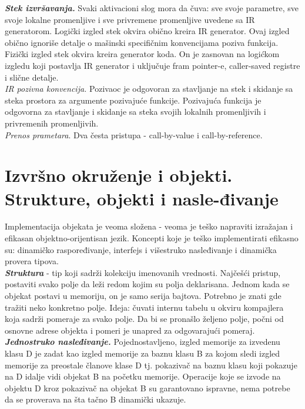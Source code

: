 \documentclass[10pt]{extarticle}
\begin{document}
\textit{\textbf{Stek izvršavanja.}} Svaki aktivacioni slog mora da čuva: sve svoje parametre, sve svoje lokalne promenljive i sve privremene promenljive uvedene sa IR generatorom. Logički izgled stek okvira obično kreira IR generator. Ovaj izgled obično ignoriše detalje o mašinski specifičnim konvencijama poziva funkcija. Fizički izgled stek okvira kreira generator koda. On je zasnovan na logićkom izgledu koji postavlja IR generator i uključuje fram pointer-e, caller-saved registre i slične detalje. \\
\textit{IR pozivna konvencija.} Pozivaoc je odgovoran za stavljanje na stek i skidanje sa steka prostora za argumente pozivajuće funkcije. Pozivajuća funkcija je odgovorna za stavljanje i skidanje sa steka svojih lokalnih promenljivih i privremenih promenljivih.\\
\textit{Prenos prametara}. Dva česta pristupa - call-by-value i call-by-reference.

\section{Izvršno okruženje i objekti. Strukture, objekti i nasle-đivanje}
\noindent
Implementacija objekata je veoma složena - veoma je teško napraviti izražajan i efikasan objektno-orijentisan jezik. Koncepti koje je teško implementirati efikasno su: dinamičko raspoređivanje, interfejs i višestruko nasleđivanje i dinamička provera tipova.\\
\textit{\textbf{Struktura}} - tip koji sadrži kolekciju imenovanih vrednosti. Najčešći pristup, postaviti svako polje da leži redom kojim su polja deklarisana. Jednom kada se objekat postavi u memoriju, on je samo serija bajtova. Potrebno je znati gde tražiti neko konkretno polje. Ideja: čuvati internu tabelu u okviru kompajlera koja sadrži pomeraje za svako polje. Da bi se pronašlo željeno polje, počni od osnovne adrese objekta i pomeri je unapred za odgovarajući pomeraj.\\
\textit{\textbf{Jednostruko nasleđivanje.}} Pojednostavljeno, izgled memorije za izvedenu klasu D je zadat kao izgled memorije za baznu klasu B za kojom sledi izgled memorije za preostale članove klase D tj. pokazivač na baznu klasu koji pokazuje na D idalje vidi objekat B na početku memorije. Operacije koje se izvode na objektu D kroz pokazivač na objekat B su garantovano ispravne, nema potrebe da se proverava na šta tačno B dinamički ukazuje.
\end{document}

